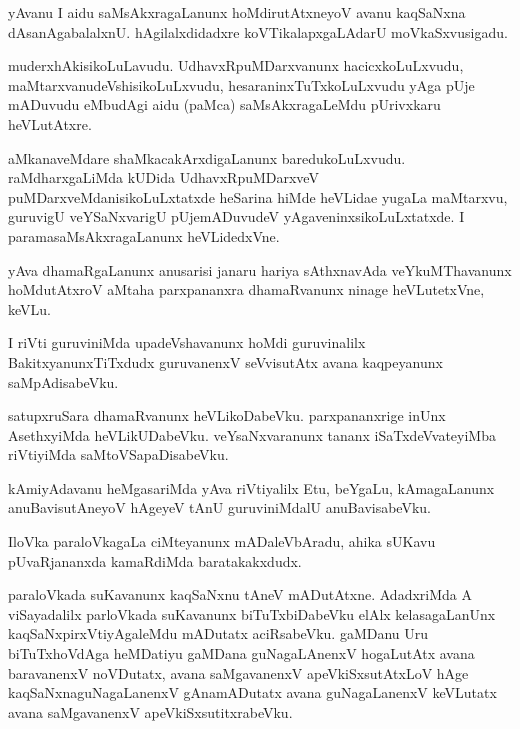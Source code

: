 \documentclass{article}
\begin{document}
\begin{mn}%
yAvanu I aidu saMsAkxragaLanunx hoMdirutAtxneyoV avanu kaqSaNxna dAsanAgabalalxnU. 
hAgilalxdidadxre koVTikalapxgaLAdarU moVkaSxvusigadu.
\end{mn}

\begin{mn}%
muderxhAkisikoLuLavudu. UdhavxRpuMDarxvanunx hacicxkoLuLxvudu, 
maMtarxvanudeVshisikoLuLxvudu, hesaraninxTuTxkoLuLxvudu yAga pUje mADuvudu eMbudAgi aidu 
(paMca) saMsAkxragaLeMdu pUrivxkaru heVLutAtxre.
\end{mn}

\begin{mn}%
aMkanaveMdare shaMkacakArxdigaLanunx baredukoLuLxvudu. raMdharxgaLiMda kUDida 
UdhavxRpuMDarxveV puMDarxveMdanisikoLuLxtatxde heSarina hiMde heVLidae yugaLa maMtarxvu, 
guruvigU veYSaNxvarigU pUjemADuvudeV yAgaveninxsikoLuLxtatxde. I paramasaMsAkxragaLanunx 
heVLidedxVne.
\end{mn}

\begin{mn}%
yAva dhamaRgaLanunx anusarisi janaru hariya sAthxnavAda veYkuMThavanunx hoMdutAtxroV 
aMtaha parxpananxra dhamaRvanunx ninage heVLutetxVne, keVLu.
\end{mn}

\begin{mn}%
I riVti guruviniMda upadeVshavanunx hoMdi guruvinalilx BakitxyanunxTiTxdudx guruvanenxV 
seVvisutAtx avana kaqpeyanunx saMpAdisabeVku.
\end{mn}

\begin{mn}%
satupxruSara dhamaRvanunx heVLikoDabeVku. parxpananxrige inUnx AsethxyiMda heVLikUDabeVku. 
veYsaNxvaranunx tananx iSaTxdeVvateyiMba riVtiyiMda saMtoVSapaDisabeVku.
\end{mn}

\begin{mn}%
kAmiyAdavanu heMgasariMda yAva riVtiyalilx Etu, beYgaLu, kAmagaLanunx anuBavisutAneyoV 
hAgeyeV tAnU guruviniMdalU anuBavisabeVku.
\end{mn}

\begin{mn}%
IloVka paraloVkagaLa ciMteyanunx mADaleVbAradu, ahika sUKavu pUvaRjananxda kamaRdiMda 
baratakakxdudx.
\end{mn}

\begin{mn}%
paraloVkada suKavanunx kaqSaNxnu tAneV mADutAtxne. AdadxriMda A viSayadalilx parloVkada 
suKavanunx biTuTxbiDabeVku elAlx kelasagaLanUnx kaqSaNxpirxVtiyAgaleMdu mADutatx 
aciRsabeVku. gaMDanu Uru biTuTxhoVdAga heMDatiyu gaMDana guNagaLAnenxV hogaLutAtx avana 
baravanenxV noVDutatx, avana saMgavanenxV apeVkiSxsutAtxLoV hAge kaqSaNxnaguNagaLanenxV 
gAnamADutatx avana guNagaLanenxV keVLutatx avana saMgavanenxV apeVkiSxsutitxrabeVku.
\end{mn}
\end{document}
